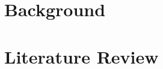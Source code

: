\documentclass[12pt]{report}
\begin{document}
    \chapter{Background}
    
    
    \chapter{Literature Review}
    
\end{document}
